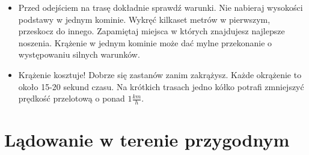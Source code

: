 \documentclass{article}
\begin{document}
\begin{itemize}
\item Przed odejściem na trasę dokładnie sprawdź warunki. Nie nabieraj
    wysokości podstawy w jednym kominie. Wykręć kilkaset metrów w pierwszym,
    przeskocz do innego. Zapamiętaj miejsca w których
    znajdujesz najlepsze noszenia. Krążenie w jednym kominie może dać
    mylne przekonanie o występowaniu silnych warunków.

\item Krążenie kosztuje! Dobrze się zastanów zanim zakrążysz. Każde
    okrążenie to około 15-20 sekund czasu. Na krótkich trasach jedno
    kółko potrafi zmniejszyć prędkość przelotową o ponad $1\frac{km}{h}$.
\end{itemize}
\newpage

\section{Lądowanie w terenie przygodnym}
\end{document}
